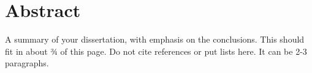 \chapter*{Abstract}

A summary of your dissertation, with emphasis on the conclusions. This should fit in about ¾ of this page. Do not cite references or put lists here. It can be 2-3 paragraphs.
